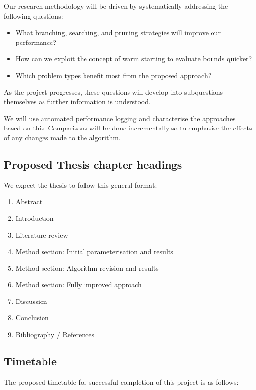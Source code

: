 \documentclass[12pt, a4paper]{article}
\begin{document}
Our research methodology will be driven by systematically addressing the following questions:

\begin{itemize}
\item What branching, searching, and pruning strategies will improve our performance?
\item How can we exploit the concept of warm starting to evaluate bounds quicker?
\item Which problem types benefit most from the proposed approach?
\end{itemize}

As the project progresses, these questions will develop into subquestions themselves as further information is understood.

We will use automated performance logging and characterise the approaches based on this. Comparisons will be done incrementally so to emphasise the effects of any changes made to the algorithm.

\newpage
\subsection{Proposed Thesis chapter headings}
We expect the thesis to follow this general format:
\begin{enumerate}
  \item Abstract
  \item Introduction
  \item Literature review
  \item Method section: Initial parameterisation and results
  \item Method section: Algorithm revision and results 
  \item Method section: Fully improved approach
  \item Discussion
  \item Conclusion
  \item Bibliography / References
\end{enumerate}
\subsection{Timetable}
The proposed timetable for successful completion of this project is as follows:
\end{document}
